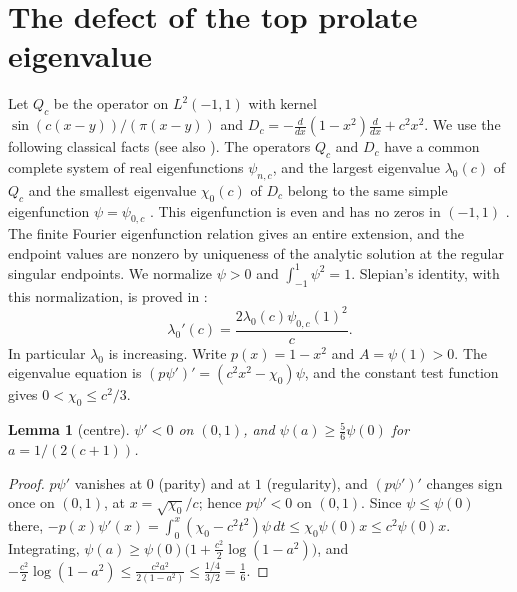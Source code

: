 \documentclass[11pt]{amsart}
\newtheorem{lemma}[proposition]{Lemma}
\theoremstyle{remark}
\numberwithin{equation}{section}
\begin{document}
\section{The defect of the top prolate eigenvalue}\label{sec:defect}
Let $Q_c$ be the operator on $L^2(-1,1)$ with kernel $\sin(c(x-y))/(\pi(x-y))$ and $D_c=-\frac d{dx}(1-x^2)\frac d{dx}+c^2x^2$. We use the following classical facts (see also \cite{Slepian65,Osipov13}). The operators $Q_c$ and $D_c$ have a common complete system of real eigenfunctions $\psi_{n,c}$, and the largest eigenvalue $\lambda_0(c)$ of $Q_c$ and the smallest eigenvalue $\chi_0(c)$ of $D_c$ belong to the same simple eigenfunction $\psi=\psi_{0,c}$ \cite[Section~2.1]{BJK21}. This eigenfunction is even and has no zeros in $(-1,1)$ \cite[Theorems~1 and~3]{Osipov12}. The finite Fourier eigenfunction relation gives an entire extension, and the endpoint values are nonzero by uniqueness of the analytic solution at the regular singular endpoints. We normalize $\psi>0$ and $\int_{-1}^1\psi^2=1$. Slepian's identity, with this normalization, is proved in \cite[Lemma~2.1]{MoriPSWF}:
\begin{equation}\label{eq:slepian}
\lambda_0'(c)=\frac{2\lambda_0(c)\psi_{0,c}(1)^2}c .
\end{equation}
In particular $\lambda_0$ is increasing. Write $p(x)=1-x^2$ and $A=\psi(1)>0$. The eigenvalue equation is $(p\psi')'=(c^2x^2-\chi_0)\psi$, and the constant test function gives $0<\chi_0\le c^2/3$.

\begin{lemma}[centre]\label{lem:centre}
$\psi'<0$ on $(0,1)$, and $\psi(a)\ge\frac56\psi(0)$ for $a=1/(2(c+1))$.
\end{lemma}
\begin{proof}
$p\psi'$ vanishes at $0$ (parity) and at $1$ (regularity), and $(p\psi')'$ changes sign once on $(0,1)$, at $x=\sqrt{\chi_0}/c$; hence $p\psi'<0$ on $(0,1)$. Since $\psi\le\psi(0)$ there, $-p(x)\psi'(x)=\int_0^x(\chi_0-c^2t^2)\psi\,dt\le\chi_0\psi(0)x\le c^2\psi(0)x$. Integrating, $\psi(a)\ge\psi(0)\bigl(1+\frac{c^2}2\log(1-a^2)\bigr)$, and $-\frac{c^2}2\log(1-a^2)\le\frac{c^2a^2}{2(1-a^2)}\le\frac{1/4}{3/2}=\frac16$.
\end{proof}
\end{document}
